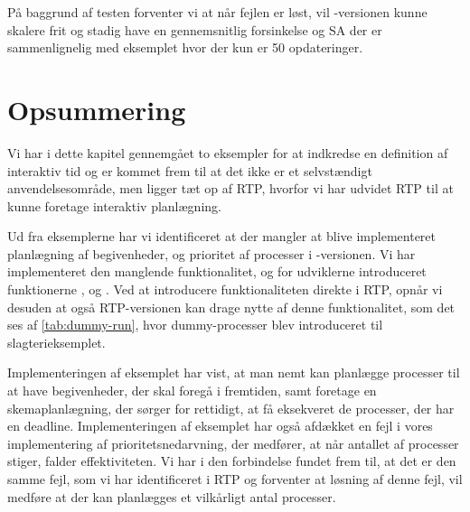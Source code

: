 På baggrund af testen forventer vi at når fejlen er løst, vil -versionen kunne skalere frit og stadig have en gennemsnitlig forsinkelse og SA der er sammenlignelig med eksemplet hvor der kun er 50 opdateringer.
\section{Opsummering}

Vi har i dette kapitel gennemgået to eksempler for at indkredse en definition af interaktiv tid og er kommet frem til at det ikke er et selvstændigt anvendelsesområde, men ligger tæt op af RTP, hvorfor vi har udvidet RTP til at kunne foretage interaktiv planlægning.

Ud fra eksemplerne har vi identificeret at der mangler at blive implementeret  planlægning af begivenheder, og prioritet af processer i -versionen. Vi har implementeret den manglende funktionalitet, og for udviklerne introduceret funktionerne ,   og . Ved at introducere funktionaliteten direkte i RTP, opnår vi desuden at også RTP-versionen kan drage nytte af denne funktionalitet, som det ses af \cref{tab:dummy-run}, hvor dummy-processer blev introduceret til slagterieksemplet.

Implementeringen af eksemplet har vist, at man nemt kan planlægge processer til at have begivenheder, der skal foregå i fremtiden, samt foretage en skemaplanlægning, der sørger for  rettidigt, at få eksekveret de processer, der har en deadline. Implementeringen af eksemplet har også afdækket en fejl i vores implementering af prioritetsnedarvning, der medfører, at når antallet af processer stiger, falder effektiviteten. Vi har i den forbindelse fundet frem til, at det er den samme fejl, som vi har identificeret i RTP og forventer at løsning af denne fejl, vil medføre at der kan planlægges et vilkårligt antal processer.
